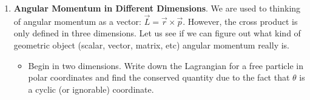 \documentclass[fleqn]{article}
\begin{document}
\begin{enumerate}
      \textcolor{hwColor}{
        We got the free-fall acceleration as:
        \\
        \\
        $
          g=g_0+(\omega \times r) \times \omega=-g_0 \hat{r}+\omega^2 r sin(\phi) \hat{\rho}
        $
        \\
        \\
        \begin{itemize}
          \item $\hat{r}$: Spherical radial vector
          \item $\hat{\rho}$: Cylindrical radial vector
        \end{itemize}
      }

      \textcolor{hwColor}{
        At the equator we have:
        \begin{itemize}
          \item $g=b g_0$
          \item $g=g_0-r \omega^2$
        \end{itemize} 
      }

      \textcolor{hwColor}{
        Based on what we have so far:
        \\
        \\
        $
          g=-g_0 \hat{r}+(1-b) g_0 sin(\phi) \hat{\rho}
          \\
          \\
          =-g_0 \left[cos(\phi) \hat{z}+sin(\phi) \hat{\rho}\right]+(1-b) g_0 sin(\phi) \hat{\rho}
          \\
          \\
          =-g_0 cos(\phi) \hat{z}+\left[(1-b) g_0 sin(\phi)-g_0 sin(\phi)\right] \rho
          \\
          \\
          =-g_0 cos(\phi) \hat{z}-b g_0 sin(\phi) \hat{\rho}
          \\
          \\
          \\
          |g|=\sqrt{\left(-g_0 cos(\phi)\right)^2+\left(b g_0 sin(\phi)\right)^2}
          \\
          \\
          \\
          \therefore ~~~~ |g|=g_0\sqrt{cos^2(\phi)+b^2 sin^2(\phi)} ~~~~ \surd
        $
      }


    \item \textbf{Angular Momentum in Different Dimensions}. We are used to thinking of angular momentum as a vector:
    $\overrightarrow{L}=\overrightarrow{r} \times \overrightarrow{p}$. However, the cross product is only defined in three dimensions. Let us
    see if we can figure out what kind of geometric object (scalar, vector,
    matrix, etc) angular momentum really is.
    \begin{itemize}
      \item Begin in two dimensions. Write down the Lagrangian for a free
      particle in polar coordinates and find the conserved quantity due
      to the fact that $\theta$ is a cyclic (or ignorable) coordinate.


\end{itemize}
\end{enumerate}
\end{document}
